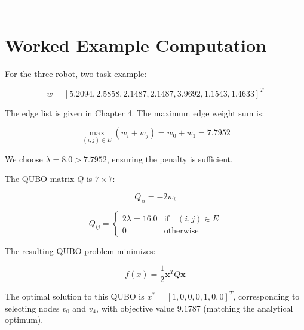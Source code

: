 ---

\section{Worked Example Computation}

For the three-robot, two-task example:

\begin{equation}
w = [5.2094, 2.5858, 2.1487, 2.1487, 3.9692, 1.1543, 1.4633]^T
\end{equation}

The edge list is given in Chapter 4. The maximum edge weight sum is:

\begin{equation}
\max_{(i,j) \in E} (w_i + w_j) = w_0 + w_1 = 7.7952
\end{equation}

We choose $\lambda = 8.0 > 7.7952$, ensuring the penalty is sufficient.

The QUBO matrix $Q$ is $7 \times 7$:

\begin{equation}
Q_{ii} = -2w_i
\end{equation}

\begin{equation}
Q_{ij} = \begin{cases} 2\lambda = 16.0 & \text{if} \quad (i,j) \in E \\ 0 & \text{otherwise} \end{cases}
\end{equation}

The resulting QUBO problem minimizes:

\begin{equation}
f(x) = \frac{1}{2} \mathbf{x}^T Q \mathbf{x}
\end{equation}

The optimal solution to this QUBO is $x^* = [1, 0, 0, 0, 1, 0, 0]^T$, corresponding to selecting nodes $v_0$ and $v_4$, with objective value $9.1787$ (matching the analytical optimum).
